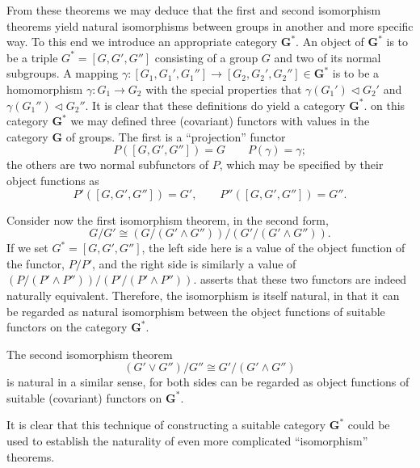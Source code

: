 \documentclass[11pt,a4paper]{report}
\begin{document}
From these theorems we may deduce that the first and second isomorphism theorems yield natural isomorphisms between groups
in another and more specific way. To this end we introduce an appropriate category $\mathbf{G}^\ast$. An object of 
$\mathbf{G}^\ast$ is to be a triple $G^\ast=[G,G',G'']$ consisting of a group $G$ and two of its normal subgroups. A mapping
$\gamma:[G_1,G_1',G_1'']\rightarrow [G_2,G_2',G_2'']\in\mathbf{G}^\ast$ is to be a homomorphism $\gamma:G_1\rightarrow G_2$
with the special properties that $\gamma(G_1')\triangleleft G_2'$ and  $\gamma(G_1'')\triangleleft G_2''$. It is clear that 
these definitions do yield a category $\mathbf{G}^\ast$. on this category $\mathbf{G}^\ast$ we may defined three (covariant)
functors with values in the category $\mathbf{G}$ of groups. The first is a ``projection'' functor
\begin{equation*}
	P([G,G',G''])= G\qquad P(\gamma)= \gamma;
\end{equation*}
the others are two normal subfunctors of $P$, which may be specified by their object functions as
\begin{equation*}
	P'([G,G',G''])= G',\qquad P''([G,G',G''])= G''.
\end{equation*}

Consider now the first isomorphism theorem, in the second form,
\begin{equation}\label{eq:second-iso2}
	G/G'\cong (G/(G'\wedge G''))/(G'/(G'\wedge G'')).
\end{equation}
If we set $G^\ast=[G,G',G'']$, the left side here is a value of the object function of the functor, $P/P'$, and the right
side is similarly a value of $(P/(P'\wedge P''))/(P'/(P'\wedge P''))$.  asserts that these two functors
are indeed naturally equivalent. Therefore, the isomorphism  is itself natural, in that it can be
regarded as natural isomorphism between the object functions of suitable functors on the category $\mathbf{G}^\ast$.

The second isomorphism theorem
\begin{equation*}
	(G'\vee G'')/G''\cong G'/(G'\wedge G'')
\end{equation*}
is natural in a similar sense, for both sides can be regarded as object functions of suitable (covariant) functors on $\mathbf{G}^\ast$.

It is clear that this technique of constructing a suitable category $\mathbf{G}^\ast$ could be used to establish the naturality of
even more complicated ``isomorphism'' theorems.
\end{document}
